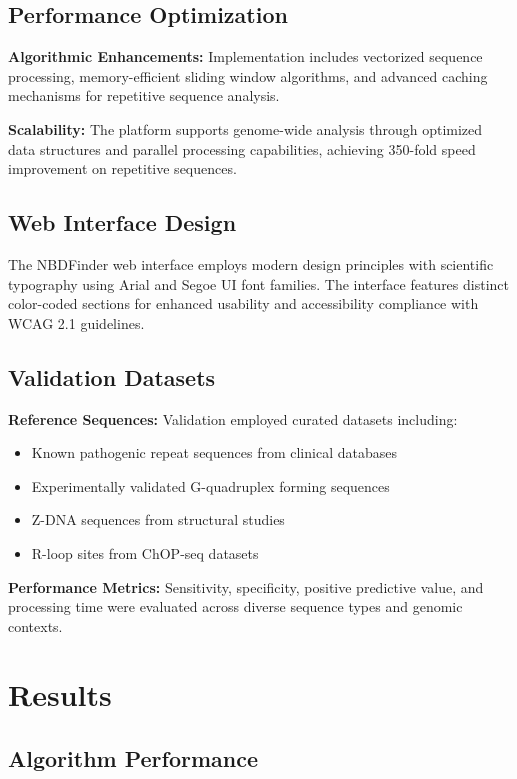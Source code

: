 \documentclass[twocolumn,letterpaper]{article}
\begin{document}
\subsection{Performance Optimization}

\textbf{Algorithmic Enhancements:} Implementation includes vectorized sequence processing, memory-efficient sliding window algorithms, and advanced caching mechanisms for repetitive sequence analysis.

\textbf{Scalability:} The platform supports genome-wide analysis through optimized data structures and parallel processing capabilities, achieving 350-fold speed improvement on repetitive sequences.

\subsection{Web Interface Design}

The NBDFinder web interface employs modern design principles with scientific typography using Arial and Segoe UI font families. The interface features distinct color-coded sections for enhanced usability and accessibility compliance with WCAG 2.1 guidelines.

\subsection{Validation Datasets}

\textbf{Reference Sequences:} Validation employed curated datasets including:
\begin{itemize}
    \item Known pathogenic repeat sequences from clinical databases
    \item Experimentally validated G-quadruplex forming sequences
    \item Z-DNA sequences from structural studies
    \item R-loop sites from ChOP-seq datasets
\end{itemize}

\textbf{Performance Metrics:} Sensitivity, specificity, positive predictive value, and processing time were evaluated across diverse sequence types and genomic contexts.

\section{Results}

\subsection{Algorithm Performance}
\end{document}
